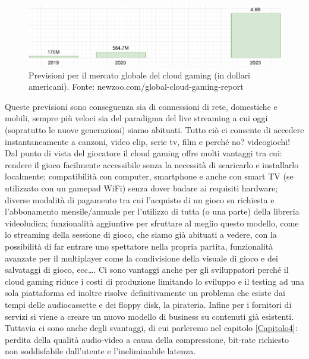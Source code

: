 \begin{figure}[H]
	\includegraphics[width=\linewidth]{immagini/Newzoo_Cloud_Gaming_Revenues}
	\caption{Previsioni per il mercato globale del cloud gaming (in dollari americani). Fonte: newzoo.com/global-cloud-gaming-report}
	\label{fig:Newzoo_Cloud_Gaming_Revenues}
\end{figure}

Queste previsioni sono conseguenza sia di connessioni di rete, domestiche e mobili, sempre più veloci sia del paradigma del live streaming a cui oggi (sopratutto le nuove generazioni) siamo abituati. Tutto ciò ci consente di accedere instantaneamente a canzoni, video clip, serie tv, film e perché no? videogiochi! Dal punto di vista del giocatore il cloud gaming offre molti vantaggi tra cui: rendere il gioco facilmente accessibile senza la necessità di scaricarlo e installarlo localmente; compatibilità con computer, smartphone e anche con smart TV (se utilizzato con un gamepad WiFi) senza dover badare ai requisiti hardware; diverse modalità di pagamento tra cui l'acquisto di un gioco su richiesta e l'abbonamento mensile/annuale per l'utilizzo di tutta (o una parte) della libreria videoludica; funzionalità aggiuntive per sfruttare al meglio questo modello, come lo streaming della sessione di gioco, che siamo già abituati a vedere, con la possibilità di far entrare uno spettatore nella propria partita, funzionalità avanzate per il multiplayer come la condivisione della visuale di gioco e dei salvataggi di gioco, ecc\dots. Ci sono vantaggi anche per gli sviluppatori perché il cloud gaming riduce i costi di produzione limitando lo sviluppo e il testing ad una sola piattaforma ed inoltre risolve definitivamente un problema che esiste dai tempi delle audiocassette e dei floppy disk, la pirateria. Infine per i fornitori di servizi si viene a creare un nuovo modello di business su contenuti già esistenti. Tuttavia ci sono anche degli svantaggi, di cui parleremo nel capitolo \ref{Capitolo4}: perdita della qualità audio-video a causa della compressione, bit-rate richiesto non soddisfabile dall'utente e l'ineliminabile latenza.